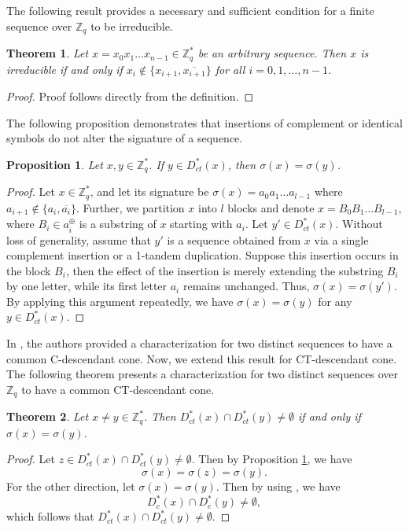 \documentclass[pdflatex,sn-mathphys-num]{sn-jnl}
\theoremstyle{theorem}%
\newtheorem{theorem}{Theorem}
\newtheorem{proposition}{Proposition}
\theoremstyle{definition}
\theoremstyle{construction}
\newtheorem{open problem}{Open problem}
\begin{document}
The following result provides a necessary and sufficient condition for a finite sequence over $\mathbb{Z}_q$ to be irreducible.
 \begin{theorem}
 	Let $x=x_0x_1\dots x_{n-1}\in \mathbb{Z}_q^{*}$ be an arbitrary sequence. Then $x$ is irreducible if and only if  $x_i\notin \{x_{i+1}, \overline{x_{i+1}} \} $ for all $i=0,1, \dots, n-1$.
 \end{theorem}
 \begin{proof}
 	Proof follows directly from the definition.
 \end{proof}
 
 The following proposition demonstrates that insertions of complement or identical symbols do not alter the signature of a sequence.
  \begin{proposition}\label{do not alter}
 	Let $x, y\in \mathbb{Z}_{q}^{*}$. If $y\in D_{ct}^{*}(x)$, then $\sigma (x)=\sigma (y)$.
 \end{proposition}
\begin{proof}
	Let $x \in \mathbb{Z}_q^*$, and let its signature be $\sigma(x) = a_0 a_1 \dots a_{l-1}$ where $a_{i+1} \notin \{a_i, \overline{a_i}\}$. Further, we partition $x$ into $l$ blocks and denote $x = B_0 B_1 \dots B_{l-1}$, where $B_i \in a_i^\oplus$ is a substring of $x$ starting with $a_i$. Let $y' \in D_{ct}^*(x)$. Without loss of generality, assume that $y'$ is a sequence obtained from $x$ via a single complement insertion or a 1-tandem duplication. Suppose this insertion occurs in the block $B_i$, then the effect of the insertion is merely extending the substring $B_i$ by one letter, while its first letter $a_i$ remains unchanged. Thus, $\sigma(x) = \sigma(y')$. By applying this argument repeatedly, we have $\sigma(x) = \sigma(y)$ for any $y \in D_{ct}^*(x)$.
\end{proof}
 In \cite[Theorem 5]{ys2}, the authors provided a characterization for two distinct sequences to have a common C-descendant cone. Now, we extend this result for CT-descendant cone. The following theorem presents a characterization for two distinct sequences over $\mathbb{Z}_q$ to have a common CT-descendant cone.
 \begin{theorem}\label{signature characterizes}
Let $x\ne y\in \mathbb{Z}_{q}^{*}$. Then  $ D_{ct}^{*}(x) \cap D_{ct}^{*}(y) \ne \emptyset $ if and only if $\sigma (x)= \sigma (y)$.
 \end{theorem}
 \begin{proof}
 Let $z \in  D_{ct}^{*}(x) \cap D_{ct}^{*}(y) \ne \emptyset $. Then by Proposition \ref{do not alter}, we have
 \begin{equation*}
 	\sigma (x)= \sigma (z)=\sigma (y).
 \end{equation*}
 For the other direction, let $\sigma (x)= \sigma (y)$. Then by using \cite[Theorem 5]{ys2}, we have 
 \begin{equation*}
 	 D_{c}^{*}(x) \cap D_{c}^{*}(y) \ne \emptyset,
 \end{equation*} 
 which follows that $ D_{ct}^{*}(x) \cap D_{ct}^{*}(y) \ne \emptyset $.
 \end{proof}
\end{document}
